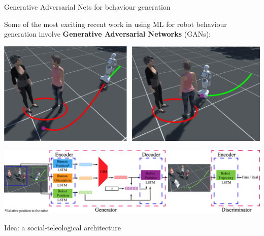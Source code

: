 \documentclass[xcolor=table]{beamer}
\begin{document}
{

\begin{frame}{Generative Adversarial Nets for behaviour generation}

    Some of the most exciting recent work in using ML for robot behaviour
    generation involve \textbf{Generative Adversarial Networks} (GANs):

            \begin{center}
                \includegraphics[width=0.6\linewidth]{figs/generation/fangkai-yang-appgan-traj.png}

                \includegraphics[width=0.8\linewidth]{figs/generation/fangkai-yang-appgan.png}
            \end{center}
\end{frame}
}

\begin{frame}{Idea: a social-teleological architecture}

\end{frame}







\end{document}
